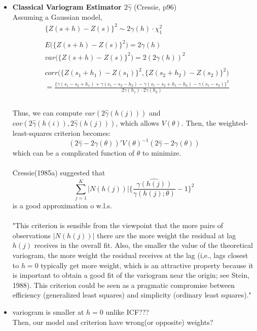 \documentclass[11pt]{article}
\begin{document}
\begin{itemize}
\item \textbf{Classical Variogram Estimator $2\hat{\gamma}$} (Cressie, p96)\\
Assuming a Gaussian model,\\
\begin{align*}
&\{Z(s+h) - Z(s)\}^2 \sim 2\gamma(h)\cdot \chi_1^2\\
\\
&E\biggl( \{ Z(s+h) - Z(s)\}^2\biggl) = 2\gamma(h)\\
&var\biggl( \{ Z(s+h) - Z(s)\}^2\biggl) = 2(2\gamma(h))^2\\
\\
&corr\biggl(\{Z(s_1 + h_1) - Z(s_1)\}^2, \{ Z(s_2 + h_2) - Z(s_2) \}^2 \biggl)\\
&= \frac{\biggl\{ \gamma(s_1 - s_2 + h_1) + \gamma(s_1 - s_2 - h_2) - \gamma(s_1 - s_2 + h_1 - h_2) - \gamma(s_1 - s_2) \biggl\}^2 }{2\gamma(h_1) \cdot 2\gamma(h_2)}\\
\end{align*}
\\
Thus, we can compute $var(2\hat{\gamma}(h(j)))$ and $cov(2\hat{\gamma}(h(i)), 2\hat{\gamma}(h(j)))$, which allows $V(\theta)$. Then, the weighted-least-squares criterion becomes:\\ 
$$(2\hat{\gamma} - 2\gamma(\theta))' V(\theta)^{-1} (2\hat{\gamma} - 2\gamma(\theta))$$
which can be a complicated function of $\theta$ to minimize.\\
\\
Cressie(1985a) suggested that 
$$\sum_{j=1}^{K} |N(h(j))| \biggl\{ \frac{\hat{\gamma(h(j))}}{\gamma(h(j);\theta)} -1 \biggl \}^2$$
is a good approximation o w.l.s.\\
\\
"This criterion is sensible from the viewpoint that the more pairs of observations $|N(h(j))|$ there are the more weight the residual at lag $h(j)$ receives in the overall fit. Also, the smaller the value of the theoretical variogram, the more weight the residual receives at the lag (i,e., lags closest to $h=0$ typically get more weight, which is an attractive property because it is important to obtain a good fit of the variogram near the origin; see Stein, 1988). This criterion could be seen as a pragmatic compromise between efficiency (generalized least squares) and simplicity (ordinary least squares)."
\\
\item {\color{red} variogram is smaller at $h=0$ unlike ICF???\\ Then, our model and criterion have wrong(or opposite) weights?}\\


\end{itemize}
\end{document}
